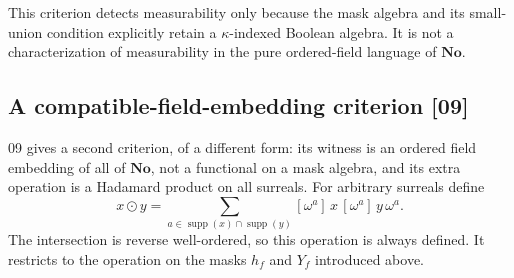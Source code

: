 \documentclass[11pt,letterpaper]{article}
\numberwithin{equation}{section}
\theoremstyle{definition}
\theoremstyle{remark}
\newcommand{\No}{\mathbf{No}}
\newcommand{\supp}{\operatorname{supp}}
\newcommand{\coef}[2]{[\omega^{#1}]\,#2}
\newcommand{\src}[1]{\textup{\textsf{\small[#1]}}}%
\begin{document}
This criterion detects measurability only because the mask algebra and its
small-union condition explicitly retain a $\kappa$-indexed Boolean algebra.
It is not a characterization of measurability in the pure ordered-field
language of $\No$.

\subsection{A compatible-field-embedding criterion \src{09}}
09 gives a second criterion, of a different form: its witness is an
ordered field embedding of all of $\No$, not a functional on a mask
algebra, and its extra operation is a Hadamard product on all surreals.
For arbitrary surreals define
\[
 x\odot y=\sum_{a\in\supp(x)\cap\supp(y)}\coef{a}{x}\,\coef{a}{y}\,\omega^a.
\]
The intersection is reverse well-ordered, so this operation is always
defined. It restricts to the operation on the masks $h_f$ and $Y_f$
introduced above.
\end{document}
